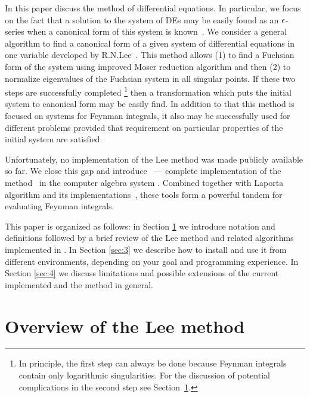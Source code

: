\documentclass[12pt,a4paper]{article}
\begin{document}
In this paper discuss the method of differential equations.
In particular, we focus on the fact that a solution to the system of DEs may be easily found as an $\epsilon$-series when a canonical form of this system is known~\cite{Henn13}.
We consider a general algorithm to find a canonical form of a given system of differential equations in one variable developed by R.N.Lee~\cite{Lee15}.
This method allows (1) to find a Fuchsian form of the system using improved Moser reduction algorithm \cite{Mos59} and then (2) to normalize eigenvalues of the Fuchsian system in all singular points.
If these two steps are successfully completed%
\footnote{In principle, the first step can always be done because Feynman integrals contain only logarithmic singularities. For the discussion of potential complications in the second step see Section~\ref{sec:2}.}
then a transformation which puts the initial system to canonical form may be easily find.
In addition to that this method is focused on systems for Feynman integrals, it also may be successfully used for different problems provided that requirement on particular properties of the initial system are satisfied.

Unfortunately, no implementation of the Lee method was made publicly available so far.
We close this gap and introduce \fuchsia \ --- complete implementation of the method~\cite{Lee15} in the computer algebra system \sage.
Combined together with Laporta algorithm \cite{Lap00} and its implementations~\cite{Smi08,MS12,Lee12,Lee13,SS13,Smi14}, these tools form a powerful tandem for evaluating Feynman integrals.

This paper is organized as follows: in Section \ref{sec:2} we introduce notation and definitions followed by a brief review of the Lee method and related algorithms implemented in \fuchsia.
In Section \ref{sec:3} we describe how to install \fuchsia and use it from different environments, depending on your goal and programming experience.
In Section \ref{sec:4} we discuss limitations and possible extensions of the current implemented and the method in general.




\section{Overview of the Lee method}
\label{sec:2}
\end{document}

